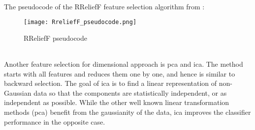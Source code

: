 \\
The pseudocode of the RReliefF feature selection algorithm from \cite{robnik2003theoretical}:
\begin{figure}[h]
    \centering
    \texttt{[image: RreliefF\_pseudocode.png]} 
	\caption{RReliefF pseudocode}
    \label{fig:RreliefF_pseudocode}
\end{figure}
\\ \indent
Another feature selection for dimensional approach is \gls{pca} and \gls{ica}. The method starts with all features and reduces them one by one, and hence is similar to backward selection. The goal of \gls{ica} is to find a linear representation of non-Gaussian data so that the components are statistically independent, or as independent as possible. While the other well known linear transformation methods (\gls{pca}) benefit from the gaussianity of the data, \gls{ica} improves the classifier performance in the opposite case.

